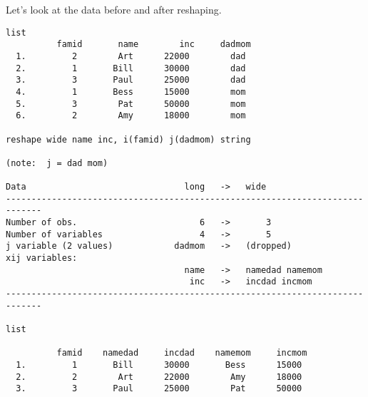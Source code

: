 Let's look at the data before and after reshaping.

\begin{lstlisting}
list
          famid       name        inc     dadmom
  1.         2        Art      22000        dad
  2.         1       Bill      30000        dad
  3.         3       Paul      25000        dad
  4.         1       Bess      15000        mom
  5.         3        Pat      50000        mom
  6.         2        Amy      18000        mom

reshape wide name inc, i(famid) j(dadmom) string

(note:  j = dad mom)

Data                               long   ->   wide
-----------------------------------------------------------------------------
Number of obs.                        6   ->       3
Number of variables                   4   ->       5
j variable (2 values)            dadmom   ->   (dropped)
xij variables:
                                   name   ->   namedad namemom
                                    inc   ->   incdad incmom
-----------------------------------------------------------------------------

list

          famid    namedad     incdad    namemom     incmom
  1.         1       Bill      30000       Bess      15000
  2.         2        Art      22000        Amy      18000
  3.         3       Paul      25000        Pat      50000
\end{lstlisting}

